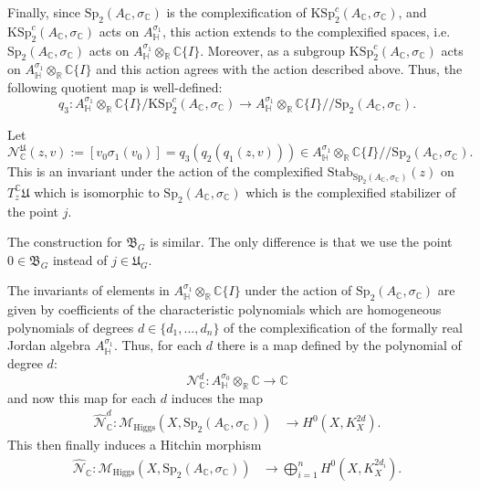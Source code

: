 \documentclass[oneside,11pt]{amsart}
\theoremstyle{definition}
\theoremstyle{remark}
\numberwithin{thm}{section}
\numberwithin{equation}{section}
\begin{document}
Finally, since $\mathrm{Sp}_2(A_\mathbb C,\sigma_\mathbb C)$ is the complexification of $\mathrm{KSp}^c_2(A_\mathbb C,\sigma_\mathbb C)$, and $\mathrm{KSp}^c_2(A_\mathbb C,\sigma_\mathbb C)$ acts on $A_\mathbb{H}^{\sigma_1}$, this action extends to the complexified spaces, i.e. $\mathrm{Sp}_2(A_\mathbb C,\sigma_\mathbb C)$ acts on $A_\mathbb{H}^{\sigma_1} \otimes_{\mathbb{R}} \mathbb{C}\{I\}$. Moreover, as a subgroup $\mathrm{KSp}^c_2(A_\mathbb C,\sigma_\mathbb C)$ acts on $A_\mathbb{H}^{\sigma_1} \otimes_{\mathbb{R}} \mathbb{C}\{I\}$ and this action agrees with the action described above. Thus, the following quotient map is well-defined: 
$$q_3\colon A_\mathbb{H}^{\sigma_1} \otimes_{\mathbb{R}} \mathbb{C}\{I\}/\mathrm{KSp}^c_2(A_\mathbb C,\sigma_\mathbb C)\to A_\mathbb{H}^{\sigma_1} \otimes_{\mathbb{R}} \mathbb{C}\{I\}/\!\!/\mathrm{Sp}_2(A_\mathbb C,\sigma_\mathbb C).$$

Let 
$$
\mathcal N^{\mathfrak U}_\mathbb C(z,v):=[v_0\sigma_1(v_0)]=q_3(q_2(q_1(z,v)))\in A_\mathbb{H}^{\sigma_1}\otimes_{\mathbb{R}}\mathbb C\{I\}/\!\!/\mathrm{Sp}_2(A_\mathbb C,\sigma_\mathbb C).
$$ 
This is an invariant under the action of the complexified 
$\mathrm{Stab}_{\mathrm{Sp}_2(A_\mathbb C,\sigma_\mathbb C)}(z)$ on $T_z^{\mathbb{C}}\mathfrak{U}$ which is isomorphic to $\mathrm{Sp}_2(A_\mathbb C,\sigma_\mathbb C)$ which is the complexified stabilizer of the point $j$.

The construction for $\mathfrak{B}_G$ is similar. The only difference is that we use the point $0\in\mathfrak{B}_G$ instead of $j\in\mathfrak{U}_G$.

The invariants of elements in $A^{\sigma_1}_\mathbb H\otimes_\mathbb R \mathbb C\{I\}$ under the action of $\mathrm{Sp}_2(A_\mathbb C,\sigma_{\mathbb{C}})$ are given by coefficients of the characteristic polynomials which are homogeneous polynomials of degrees $d \in \{d_1, ..., d_n\}$ of the complexification of the formally real Jordan algebra $A_{\mathbb{H}}^{\sigma_1}$. Thus, for each $d$ there is a map defined by the polynomial of degree $d$:
\[\mathcal{N}_{\mathbb{C}}^d\colon A_{\mathbb{H}}^{\sigma_0}\otimes_{\mathbb{R}}\mathbb{C} \to \mathbb{C}\]
and now this map for each $d$ induces the map
\begin{align*}
 \hat{\mathcal{N}}_{\mathbb{C}}^d\colon  \mathcal{M}_{\mathrm{Higgs}}(X,\mathrm{Sp}_2(A_{\mathbb{C}}, \sigma_{\mathbb{C}})) & \to H^0(X, K_X^{2d}). 
\end{align*}
This then finally induces a Hitchin morphism
\begin{align*}
 \hat{\mathcal{N}}_{\mathbb{C}}\colon  \mathcal{M}_{\mathrm{Higgs}}(X,\mathrm{Sp}_2(A_{\mathbb{C}}, \sigma_{\mathbb{C}})) & \to \bigoplus_{i=1}^{n} H^0(X, K_X^{2d_i}).
\end{align*}
\end{document}
